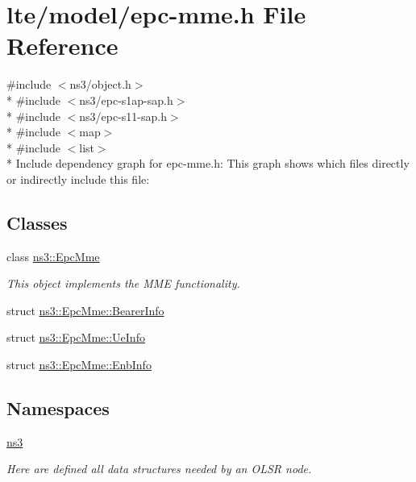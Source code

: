 \hypertarget{epc-mme_8h}{}\section{lte/model/epc-\/mme.h File Reference}
\label{epc-mme_8h}
{\ttfamily \#include $<$ns3/object.\+h$>$}\\*
{\ttfamily \#include $<$ns3/epc-\/s1ap-\/sap.\+h$>$}\\*
{\ttfamily \#include $<$ns3/epc-\/s11-\/sap.\+h$>$}\\*
{\ttfamily \#include $<$map$>$}\\*
{\ttfamily \#include $<$list$>$}\\*
Include dependency graph for epc-\/mme.h\+:
This graph shows which files directly or indirectly include this file\+:
\subsection*{Classes}
\begin{DoxyCompactItemize}
\item 
class \hyperlink{classns3_1_1EpcMme}{ns3\+::\+Epc\+Mme}
\begin{DoxyCompactList}\small\item\em This object implements the M\+ME functionality. \end{DoxyCompactList}\item 
struct \hyperlink{structns3_1_1EpcMme_1_1BearerInfo}{ns3\+::\+Epc\+Mme\+::\+Bearer\+Info}
\item 
struct \hyperlink{structns3_1_1EpcMme_1_1UeInfo}{ns3\+::\+Epc\+Mme\+::\+Ue\+Info}
\item 
struct \hyperlink{structns3_1_1EpcMme_1_1EnbInfo}{ns3\+::\+Epc\+Mme\+::\+Enb\+Info}
\end{DoxyCompactItemize}
\subsection*{Namespaces}
\begin{DoxyCompactItemize}
\item 
 \hyperlink{namespacens3}{ns3}
\begin{DoxyCompactList}\small\item\em Here are defined all data structures needed by an O\+L\+SR node. \end{DoxyCompactList}\end{DoxyCompactItemize}

